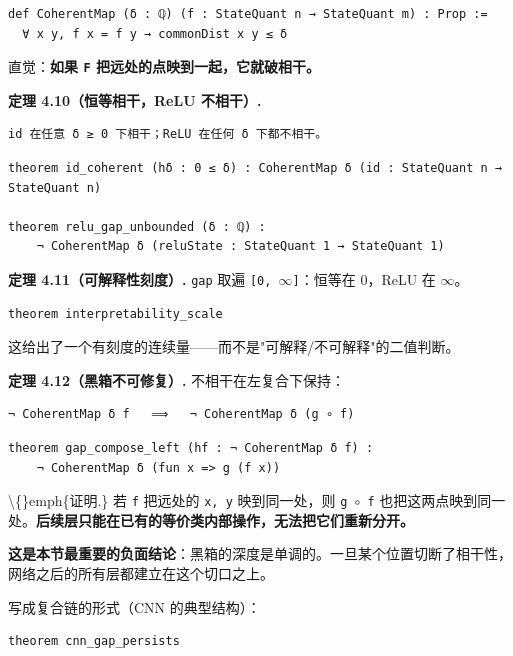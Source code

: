 \documentclass[11pt,a4paper]{ctexart}
\begin{document}
\begin{lstlisting}
def CoherentMap (δ : ℚ) (f : StateQuant n → StateQuant m) : Prop :=
  ∀ x y, f x = f y → commonDist x y ≤ δ
\end{lstlisting}

直觉：\textbf{如果 \texttt{F} 把远处的点映到一起，它就破相干。}

\textbf{定理 4.10（恒等相干，ReLU 不相干）.}

\begin{lstlisting}
id 在任意 δ ≥ 0 下相干；ReLU 在任何 δ 下都不相干。
\end{lstlisting}

\begin{lstlisting}
theorem id_coherent (hδ : 0 ≤ δ) : CoherentMap δ (id : StateQuant n → StateQuant n)

theorem relu_gap_unbounded (δ : ℚ) :
    ¬ CoherentMap δ (reluState : StateQuant 1 → StateQuant 1)
\end{lstlisting}

\textbf{定理 4.11（可解释性刻度）.} \texttt{gap} 取遍 \texttt{[0, \ensuremath{\infty}]}：恒等在 0，ReLU 在 \ensuremath{\infty}。

\begin{lstlisting}
theorem interpretability_scale
\end{lstlisting}

这给出了一个有刻度的连续量——而不是"可解释/不可解释"的二值判断。

\textbf{定理 4.12（黑箱不可修复）.} 不相干在左复合下保持：

\begin{lstlisting}
¬ CoherentMap δ f   ⟹   ¬ CoherentMap δ (g ∘ f)
\end{lstlisting}

\begin{lstlisting}
theorem gap_compose_left (hf : ¬ CoherentMap δ f) :
    ¬ CoherentMap δ (fun x => g (f x))
\end{lstlisting}

\textbackslash\{\}emph\{证明.\} 若 \texttt{f} 把远处的 \texttt{x, y} 映到同一处，则 \texttt{g \ensuremath{\circ} f} 也把这两点映到同一处。\textbf{后续层只能在已有的等价类内部操作，无法把它们重新分开。}

\textbf{这是本节最重要的负面结论}：黑箱的深度是单调的。一旦某个位置切断了相干性，网络之后的所有层都建立在这个切口之上。

写成复合链的形式（CNN 的典型结构）：

\begin{lstlisting}
theorem cnn_gap_persists
\end{lstlisting}
\end{document}
